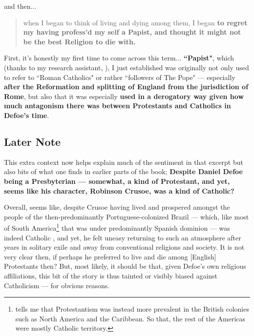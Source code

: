 \documentclass[a4paper]{article}
\begin{document}
and then...


\noindent
\begin{minipage}{1\textwidth}
\vspace{1em}
\begin{quotation}
{\ttfamily


when I began to think of living and dying among them, I began \textbf{to regret my having profess’d my self a Papist, and thought it might not be the best Religion to die with.}


}
\end{quotation}
\vspace{1em}
\end{minipage}


First, it's honestly my first time to come across this term... \textbf{``Papist"}, which (thanks to my research assistant, \cite{copilot_assistant}), I just established  was originally not only used to refer to ``Roman Catholics" or rather ``followers of The Pope" --- especially \textbf{after the Reformation and splitting of England from the jurisdiction of Rome}, but also that it was especially \textbf{used in a derogatory way given how much antagonism there was between Protestants and Catholics in Defoe's time}. 


\subsection{Later Note}


This extra context now helps explain much of the sentiment in that excerpt but also bits of what one finds in earlier parts of the book; \textbf{Despite Daniel Defoe being a Presbyterian --- somewhat, a kind of Protestant, and yet, seems like his character, Robinson Crusoe, was a kind of Catholic?}


Overall, seems like, despite Crusoe having lived and prospered amongst the people of the then-predominantly Portuguese-colonized Brazil --- which, like most of South America\footnote{\cite{copilot_assistant} tells me that Protestantism was instead more prevalent in the British colonies such as North America and the Caribbean. So that, the rest of the Americas were mostly Catholic territory.} that was under predominantly Spanish dominion --- was indeed Catholic \cite{copilot_assistant}, and yet, he felt uneasy returning to such an atmosphere after years in solitary exile and away from conventional religions and society. It is not very clear then, if perhaps he preferred to live and die among [English] Protestants then? But, most likely, it should be that, given Defoe's own religious affiliations, this bit of the story is thus tainted or visibly biased against Catholicism --- for obvious reasons.
\end{document}
